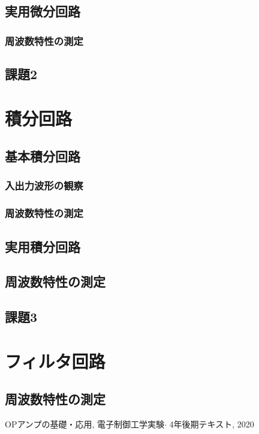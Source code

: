 \documentclass[titlepage]{jsarticle}
\begin{document}
    \subsection{実用微分回路}

        \subsubsection{周波数特性の測定}

    \subsection{課題2}

\section{積分回路}

    \subsection{基本積分回路}

        \subsubsection{入出力波形の観察}

        \subsubsection{周波数特性の測定}

    \subsection{実用積分回路}

        \subsection{周波数特性の測定}

    \subsection{課題3}

\section{フィルタ回路}

    \subsection{周波数特性の測定}
    
\begin{thebibliography}{99}
     OPアンプの基礎・応用, 電子制御工学実験$\cdot$ 4年後期テキスト, 2020
\end{thebibliography}
\end{document}
